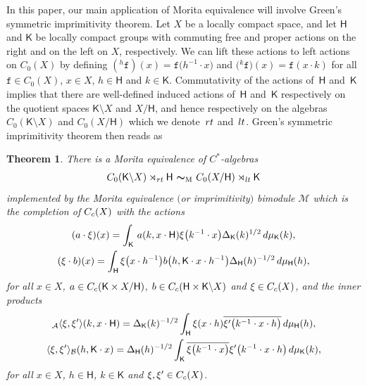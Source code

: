 \documentclass[11pt]{article}
\numberwithin{equation}{section}
\numberwithin{equation}{section}
\newcommand{\mbf}[1]{{\boldsymbol {#1} }}
\def\dd{{\rm d}}
\newcommand{\sfH}{\mathsf{H}}
\newcommand{\sfK}{\mathsf{K}}
\newcommand{\lt}{{\rm lt}}
\newcommand{\rt}{{\rm rt}}
\def\alg{{\mathcal A}}
\def\balg{{\mathcal B}}
\def\Mcal{{\mathcal M}}
\newtheorem{Theorem}{Theorem}[section]
\begin{document}
In this paper, our main application of Morita equivalence will involve
Green's symmetric imprimitivity theorem. Let $X$ be a locally compact space, and let
$\sfH $ and $\sfK $ be locally compact groups with commuting free and
proper actions on the right and on the left on $X$, respectively. We can lift these
actions to left actions on $C_0(X)$ by defining
$({}^h\mathtt{f})(x)=\mathtt{f}\big(h^{-1}\cdot x\big)$ and $\big({}^k\mathtt{f}\big)(x)=\mathtt{f}(x\cdot k)$
for all $\mathtt{f}\in C_0(X)$, $x\in X$, $h\in \sfH$ and $k\in \sfK $. Commutativity
of the actions of~$\sfH $ and~$\sfK $ implies that there are well-defined
induced actions of~$\sfH $ and~$\sfK $
respectively on the quotient spaces $\sfK {\setminus} X$ and $X/\sfH $, and hence
respectively on the algebras $C_0(\sfK {\setminus} X)$ and
$C_0(X/\sfH )$ which we denote~$\rt$ and~$\lt$. Green's symmetric imprimitivity theorem then reads as~\cite[Corollary~4.10]{Williams2007}
\begin{Theorem} \label{thm:Green}
There is a Morita
equivalence of $C^*$-algebras
\begin{gather}\label{eq:Greenimprim}
C_0(\sfK {\setminus} X)\rtimes_\rt \sfH \ \mbf\sim_{\text{\rm \tiny M}} \ C_0(X/\sfH )\rtimes_\lt \sfK
\end{gather}
implemented by the Morita equivalence $($or imprimitivity$)$
bimodule $\Mcal$ which is the completion of $C_{\rm c}(X)$ with the
actions
\begin{gather*}
(a\cdot\xi)(x) =\int_\sfK\,a(k,x\cdot\sfH) \xi\big(k^{-1}\cdot x\big)
\Delta_\sfK(k)^{1/2} \, \dd\mu_\sfK(k) , \\
(\xi\cdot b)(x) =\int_\sfH \xi\big(x\cdot h^{-1}\big) b\big(h,\sfK\cdot x\cdot h^{-1}\big) \Delta_\sfH(h)^{-1/2} \, \dd\mu_\sfH(h) ,
\end{gather*}
for all $x\in X$, $a\in C_{\rm c}(\sfK\times X/\sfH)$, $b\in C_{\rm
 c}(\sfH\times \sfK {\setminus} X)$ and $\xi\in C_{\rm
 c}(X)$, and the inner products
\begin{gather*}
{}_\alg\langle\xi,\xi'\rangle(k,x\cdot\sfH) = \Delta_\sfK(k)^{-1/2}
\int_\sfH \xi(x\cdot h) \overline{\xi'\big(k^{-1}\cdot x\cdot h\big)} \,
\dd\mu_\sfH(h) , \nonumber\\
\langle\xi,\xi'\rangle_\balg(h,\sfK\cdot x) =
\Delta_\sfH(h)^{-1/2} \int_\sfK \overline{\xi\big(k^{-1}\cdot x\big)}
\xi'\big(k^{-1}\cdot x\cdot h\big) \, \dd\mu_\sfK(k)  ,
\end{gather*}
for all $x\in X$, $h\in\sfH$, $k\in\sfK$ and $\xi,\xi'\in C_{\rm c}(X)$.
\end{Theorem}
\end{document}
